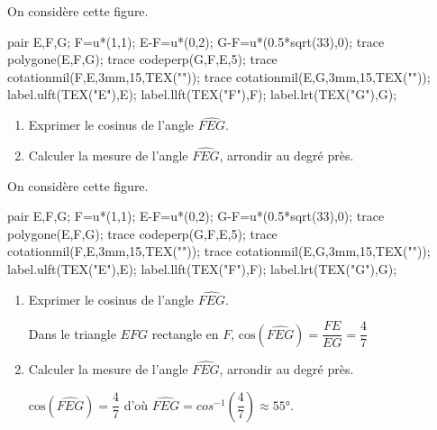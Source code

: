 \begin{exercice*}
    On considère cette figure.
    \begin{center}
        \begin{Geometrie}
            pair E,F,G;
            F=u*(1,1);
            E-F=u*(0,2);
            G-F=u*(0.5*sqrt(33),0);
            trace polygone(E,F,G);
            trace codeperp(G,F,E,5);
            trace cotationmil(F,E,3mm,15,TEX(""));
            trace cotationmil(E,G,3mm,15,TEX(""));
            label.ulft(TEX("E"),E);
            label.llft(TEX("F"),F);
            label.lrt(TEX("G"),G);
        \end{Geometrie}
    \end{center}
    \begin{enumerate}
        \item Exprimer le cosinus de l'angle $\widehat{FEG}$.
        \vspace*{20mm}
        \item Calculer la mesure de l'angle $\widehat{FEG}$, arrondir au degré près.
        \vfill
    \end{enumerate}
\end{exercice*}
\begin{corrige}
    On considère cette figure.
    \begin{center}
        \begin{Geometrie}
            pair E,F,G;
            F=u*(1,1);
            E-F=u*(0,2);
            G-F=u*(0.5*sqrt(33),0);
            trace polygone(E,F,G);
            trace codeperp(G,F,E,5);
            trace cotationmil(F,E,3mm,15,TEX(""));
            trace cotationmil(E,G,3mm,15,TEX(""));
            label.ulft(TEX("E"),E);
            label.llft(TEX("F"),F);
            label.lrt(TEX("G"),G);
        \end{Geometrie}
    \end{center}
    \begin{enumerate}
        \item Exprimer le cosinus de l'angle $\widehat{FEG}$.
        
        {\color{red}Dans le triangle $EFG$ rectangle en $F$, $\text{cos}(\widehat{FEG})=\dfrac{FE}{EG}=\dfrac47$}
        \item Calculer la mesure de l'angle $\widehat{FEG}$, arrondir au degré près.
        
        {\color{red}$\text{cos}(\widehat{FEG})=\dfrac47$ d'où $\widehat{FEG}=cos^{-1}\left(\dfrac47\right)\approx\ang{55}$.}
    \end{enumerate}
\end{corrige}

